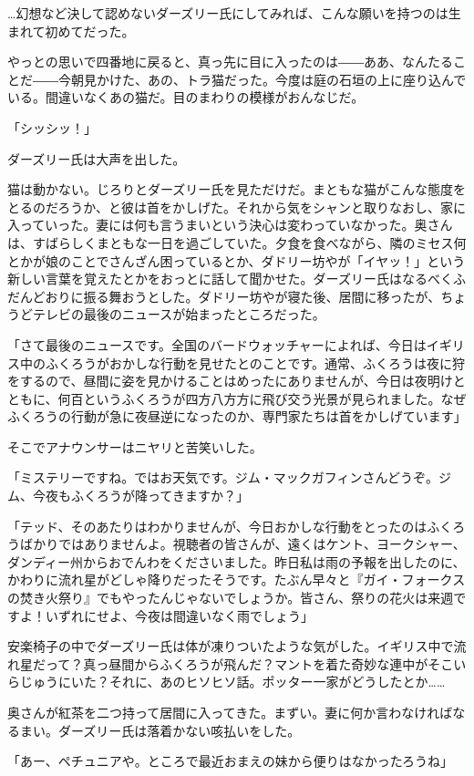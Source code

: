\documentclass[10pt,a4paper]{article}
\begin{document}
\begin{CJK}{UTF8}{min}
…幻想など決して認めないダーズリー氏にしてみれば、こんな願いを持つのは生まれて初めてだった。

やっとの思いで四番地に戻ると、真っ先に目に入ったのは――ああ、なんたることだ――今朝見かけた、あの、トラ猫だった。今度は庭の石垣の上に座り込んでいる。間違いなくあの猫だ。目のまわりの模様がおんなじだ。

「シッシッ！」

ダーズリー氏は大声を出した。

猫は動かない。じろりとダーズリー氏を見ただけだ。まともな猫がこんな態度をとるのだろうか、と彼は首をかしげた。それから気をシャンと取りなおし、家に入っていった。妻には何も言うまいという決心は変わっていなかった。奥さんは、すばらしくまともな一日を過ごしていた。夕食を食べながら、隣のミセス何とかが娘のことでさんざん困っているとか、ダドリー坊やが「イヤッ！」という新しい言葉を覚えたとかをおっとに話して聞かせた。ダーズリー氏はなるべくふだんどおりに振る舞おうとした。ダドリー坊やが寝た後、居間に移ったが、ちょうどテレビの最後のニュースが始まったところだった。

「さて最後のニュースです。全国のバードウォッチャーによれば、今日はイギリス中のふくろうがおかしな行動を見せたとのことです。通常、ふくろうは夜に狩をするので、昼間に姿を見かけることはめったにありませんが、今日は夜明けとともに、何百というふくろうが四方八方方に飛び交う光景が見られました。なぜふくろうの行動が急に夜昼逆になったのか、専門家たちは首をかしげています」

そこでアナウンサーはニヤリと苦笑いした。

「ミステリーですね。ではお天気です。ジム・マックガフィンさんどうぞ。ジム、今夜もふくろうが降ってきますか？」

「テッド、そのあたりはわかりませんが、今日おかしな行動をとったのはふくろうばかりではありませんよ。視聴者の皆さんが、遠くはケント、ヨークシャー、ダンディー州からおでんわをくださいました。昨日私は雨の予報を出したのに、かわりに流れ星がどしゃ降りだったそうです。たぶん早々と『ガイ・フォークスの焚き火祭り』でもやったんじゃないでしょうか。皆さん、祭りの花火は来週ですよ！いずれにせよ、今夜は間違いなく雨でしょう」

安楽椅子の中でダーズリー氏は体が凍りついたような気がした。イギリス中で流れ星だって？真っ昼間からふくろうが飛んだ？マントを着た奇妙な連中がそこいらじゅうにいた？それに、あのヒソヒソ話。ポッター一家がどうしたとか……

奥さんが紅茶を二つ持って居間に入ってきた。まずい。妻に何か言わなければなるまい。ダーズリー氏は落着かない咳払いをした。

「あー、ペチュニアや。ところで最近おまえの妹から便りはなかったろうね」


\end{CJK}
\end{document}
